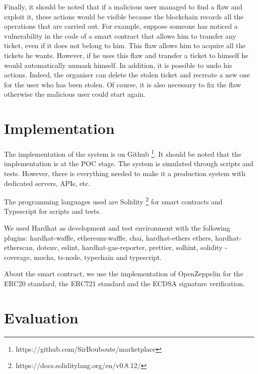 \documentclass[a4paper,11pt,oneside]{report}
\begin{document}
Finally, it should be noted that if a malicious user managed to find a flaw and exploit it, these actions would be visible because the blockchain records all the operations that are carried out. For example, suppose someone has noticed a vulnerability in the code of a smart contract that allows him to transfer any ticket, even if it does not belong to him. This flaw allows him to acquire all the tickets he wants. However, if he uses this flaw and transfer a ticket to himself he would automatically unmask himself. In addition, it is possible to undo his actions. Indeed, the organiser can delete the stolen ticket and recreate a new one for the user who has been stolen. Of course, it is also necessary to fix the flaw otherwise the malicious user could start again.

\chapter{Implementation}
The implementation of the system is on Github \footnote{https://github.com/SirBouboute/marketplace}. It should be noted that the implementation is at the POC stage. The system is simulated through scripts and tests. However, there is everything needed to make it a production system with dedicated servers, APIs, etc.

The programming languages used are Solidity \footnote{https://docs.soliditylang.org/en/v0.8.12/} for smart contracts and Typescript for scripts and tests. 

We used Hardhat as development and test environment with the following plugins: hardhat-waffle, ethereum-waffle, chai, hardhat-ethers ethers, hardhat-etherscan, dotenv, eslint, hardhat-gas-reporter, prettier, solhint, solidity -coverage, mocha, ts-node, typechain and typescript. 

About the smart contract, we use the implementation of OpenZeppelin for the ERC20 standard, the ERC721 standard and the ECDSA signature verification.

\chapter{Evaluation}
\end{document}
